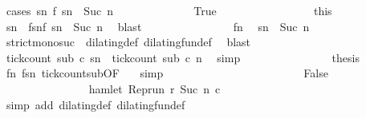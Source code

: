 \begin{isabellebody}
\ {\isacharparenleft}cases\ {\isacartoucheopen}{\isasymexists}sn\ f\ sn\ {\isacharequal}\ Suc\ n{\isacartoucheclose}{\isacharparenright}\isanewline
\ \ \ \ \ \ \ \ \ \ \ \ \isamarkupfalse%
\ True\ %
\isanewline
\ \ \ \ \ \ \ \ \ \ \ \ \ \ \isamarkupfalse%
\ this\ \isamarkupfalse%
\ sn\ \ fsn{\isacharcolon}{\isacartoucheopen}f\ sn\ {\isacharequal}\ Suc\ n{\isacartoucheclose}\ \isamarkupfalse%
\ blast\isanewline
\ \ \ \ \ \ \ \ \ \ \ \ \ \ \isamarkupfalse%
\ fn\ \isamarkupfalse%
\ {\isacartoucheopen}sn\ {\isacharequal}\ Suc\ n\ \isamarkupfalse%
\ strict{\isacharunderscore}mono{\isacharunderscore}suc\ {\isacharasterisk}\ dilating{\isacharunderscore}def\ dilating{\isacharunderscore}fun{\isacharunderscore}def\ \isamarkupfalse%
\ blast\isanewline
\ \ \ \ \ \ \ \ \ \ \ \ \ \ \isamarkupfalse%
\ {}\ \isamarkupfalse%
\ {\isacartoucheopen}tick{\isacharunderscore}count\ sub\ c\ sn\ {\isasymle}\ tick{\isacharunderscore}count\ sub\ c\ n\ \isamarkupfalse%
\ simp\isanewline
\ \ \ \ \ \ \ \ \ \ \ \ \ \ \isamarkupfalse%
\ {\isacharquery}thesis\ \isamarkupfalse%
\ fn\ fsn\ tick{\isacharunderscore}count{\isacharunderscore}sub{\isacharbrackleft}OF\ {\isacharasterisk}{\isacharbrackright}\ \isamarkupfalse%
\ simp\isanewline
\ \ \ \ \ \ \ \ \ \ \isamarkupfalse%
\isanewline
\ \ \ \ \ \ \ \ \ \ \ \ \isamarkupfalse%
\ False\ %
\isanewline
\ \ \ \ \ \ \ \ \ \ \ \ \ \ \isamarkupfalse%
\ {\isacartoucheopen}{\isasymnot}hamlet\ {\isacharparenleft}{\isacharparenleft}Rep{\isacharunderscore}run\ r{\isacharparenright}\ {\isacharparenleft}Suc\ n{\isacharparenright}\ c\isanewline
\ \ \ \ \ \ \ \ \ \ \ \ \ \ \ \ \isamarkupfalse%
\ {\isacharasterisk}\ \isamarkupfalse%
\ {\isacharparenleft}simp\ add{\isacharcolon}\ dilating{\isacharunderscore}def\ dilating{\isacharunderscore}fun{\isacharunderscore}def{\isacharparenright}\isanewline

\end{isabellebody}
